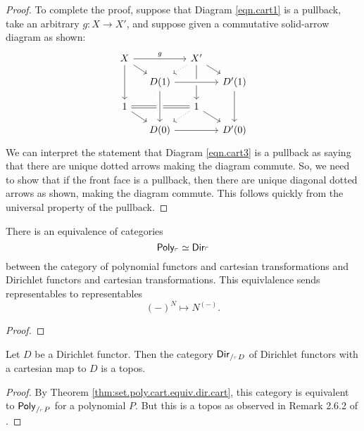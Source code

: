 \begin{proof}
To complete the proof, suppose that Diagram \ref{eqn.cart1} is a pullback, take an arbitrary $g\colon X\to X'$, and suppose given a commutative solid-arrow diagram as shown:
\[
\begin{tikzcd}[sep=small]
  X\ar[rr, "g"]\ar[dd]\ar[rd]&&
  X'\ar[dr]\ar[dd]\ar[dl, dotted]\\&
  D(1)\ar[rr, crossing over]&&
  D'(1)\ar[dd]\\
  1\ar[dr]\ar[rr, equal]&&
  1\ar[dr]\ar[dl, dotted]\\&
  D(0)\ar[from=uu, crossing over]\ar[rr]&&
  D'(0)
\end{tikzcd}
\]
We can interpret the statement that Diagram \ref{eqn.cart3} is a pullback as
saying that there are unique dotted arrows making the diagram commute. So, we need to show that if the front face is a pullback, then there are unique diagonal dotted arrows as shown, making the diagram commute. This follows quickly from the universal property of the pullback.
\end{proof}

\begin{thm}\label{thm:set.poly.cart.equiv.dir.cart}
  There is an equivalence of categories
  $$\mathsf{{Poly}}_{\ulcorner} \simeq \operatorname{\mathsf{{Dir}}}_{\ulcorner}$$
  between the category of polynomial functors and cartesian transformations and
  Dirichlet functors and cartesian transformations. This equivlalence sends
  representables to representables
  $$(-)^N \mapsto N^{(-)}.$$
\end{thm}
\begin{proof}
\end{proof}

\begin{cor}
  Let $D$ be a Dirichlet functor. Then the category
  $\operatorname{\mathsf{{Dir}}}_{/_{\ulcorner} D}$
  of Dirichlet functors with a cartesian map to $D$ is a topos.
\end{cor}
\begin{proof}
By Theorem \ref{thm:set.poly.cart.equiv.dir.cart}, this category is equivalent
to $\mathsf{{Poly}}_{/_{\ulcorner} P}$ for a polynomial $P$. But this is a topos as
observed in Remark 2.6.2 of \cite{GHK:Analytic.Monads}.
\end{proof}
  
